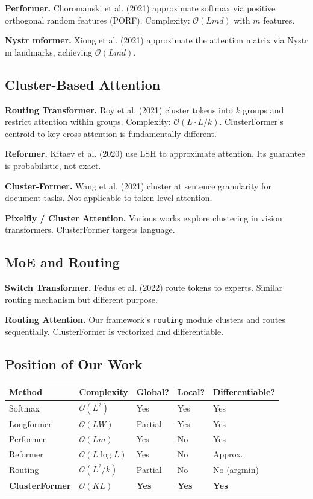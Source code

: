 \textbf{Performer.} Choromanski et al. (2021) approximate softmax via positive 
orthogonal random features (PORF). Complexity: $\mathcal{O}(L m d)$ with 
$m$ features.

\textbf{Nystr mformer.} Xiong et al. (2021) approximate the attention matrix 
via Nystr m landmarks, achieving $\mathcal{O}(L m d)$.

\subsection{Cluster-Based Attention}

\textbf{Routing Transformer.} Roy et al. (2021) cluster tokens into $k$ groups 
and restrict attention within groups. Complexity: $\mathcal{O}(L \cdot L/k)$. 
ClusterFormer's centroid-to-key cross-attention is fundamentally different.

\textbf{Reformer.} Kitaev et al. (2020) use LSH to approximate attention. Its 
guarantee is probabilistic, not exact.

\textbf{Cluster-Former.} Wang et al. (2021) cluster at sentence granularity for 
document tasks. Not applicable to token-level attention.

\textbf{Pixelfly / Cluster Attention.} Various works explore clustering in vision 
transformers. ClusterFormer targets language.

\subsection{MoE and Routing}

\textbf{Switch Transformer.} Fedus et al. (2022) route tokens to experts. Similar 
routing mechanism but different purpose.

\textbf{Routing Attention.} Our framework's \texttt{routing} module clusters and routes 
sequentially. ClusterFormer is vectorized and differentiable.

\subsection{Position of Our Work}

\begin{table}[H]
\centering
\small
\begin{tabular}{lllll}
\toprule
\textbf{Method} & \textbf{Complexity} & \textbf{Global?} & \textbf{Local?} & \textbf{Differentiable?} \\
\midrule
Softmax & $\mathcal{O}(L^2)$ & Yes & Yes & Yes \\
Longformer & $\mathcal{O}(LW)$ & Partial & Yes & Yes \\
Performer & $\mathcal{O}(Lm)$ & Yes & No & Yes \\
Reformer & $\mathcal{O}(L\log L)$ & Yes & No & Approx. \\
Routing & $\mathcal{O}(L^2/k)$ & Partial & No & No (argmin) \\
\textbf{ClusterFormer} & $\mathcal{O}(KL)$ & \textbf{Yes} & \textbf{Yes} & \textbf{Yes} \\
\bottomrule
\end{tabular}
\end{table}

